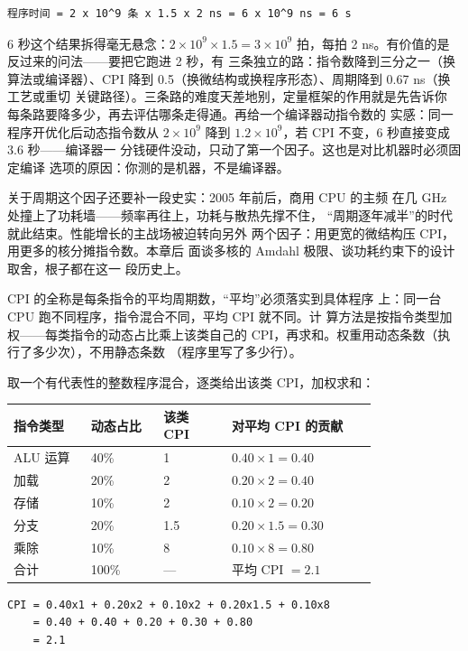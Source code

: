 \begin{lstlisting}
程序时间 = 2 x 10^9 条 x 1.5 x 2 ns = 6 x 10^9 ns = 6 s
\end{lstlisting}

6 秒这个结果拆得毫无悬念：$2\times10^9\times1.5=3\times10^9$
拍，每拍 2 ns。有价值的是反过来的问法——要把它跑进 2 秒，有
三条独立的路：指令数降到三分之一（换算法或编译器）、CPI 降到
0.5（换微结构或换程序形态）、周期降到 0.67 ns（换工艺或重切
关键路径）。三条路的难度天差地别，定量框架的作用就是先告诉你
每条路要降多少，再去评估哪条走得通。再给一个编译器动指令数的
实感：同一程序开优化后动态指令数从 $2\times10^9$ 降到
$1.2\times10^9$，若 CPI 不变，6 秒直接变成 3.6 秒——编译器一
分钱硬件没动，只动了第一个因子。这也是对比机器时必须固定编译
选项的原因：你测的是机器，不是编译器。

关于周期这个因子还要补一段史实：2005 年前后，商用 CPU 的主频
在几 GHz 处撞上了功耗墙——频率再往上，功耗与散热先撑不住，
“周期逐年减半”的时代就此结束。性能增长的主战场被迫转向另外
两个因子：用更宽的微结构压 CPI，用更多的核分摊指令数。本章后
面谈多核的 Amdahl 极限、谈功耗约束下的设计取舍，根子都在这一
段历史上。

CPI 的全称是每条指令的平均周期数，“平均”必须落实到具体程序
上：同一台 CPU 跑不同程序，指令混合不同，平均 CPI 就不同。计
算方法是按指令类型加权——每类指令的动态占比乘上该类自己的
CPI，再求和。权重用动态条数（执行了多少次），不用静态条数
（程序里写了多少行）。

取一个有代表性的整数程序混合，逐类给出该类 CPI，加权求和：

\begin{longtable}{L{0.17\linewidth}L{0.16\linewidth}L{0.15\linewidth}L{0.32\linewidth}}
\toprule
指令类型 & 动态占比 & 该类 CPI & 对平均 CPI 的贡献 \\
\midrule
ALU 运算 & 40\% & 1 & $0.40\times1=0.40$ \\\tablerowrule
加载 & 20\% & 2 & $0.20\times2=0.40$ \\\tablerowrule
存储 & 10\% & 2 & $0.10\times2=0.20$ \\\tablerowrule
分支 & 20\% & 1.5 & $0.20\times1.5=0.30$ \\\tablerowrule
乘除 & 10\% & 8 & $0.10\times8=0.80$ \\
\midrule
合计 & 100\% & --- & 平均 CPI $=2.1$ \\
\bottomrule
\end{longtable}

\begin{lstlisting}
CPI = 0.40x1 + 0.20x2 + 0.10x2 + 0.20x1.5 + 0.10x8
    = 0.40 + 0.40 + 0.20 + 0.30 + 0.80
    = 2.1
\end{lstlisting}


